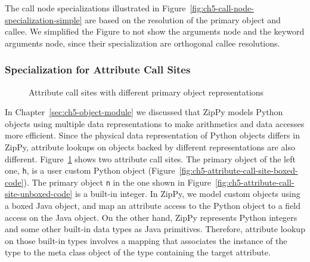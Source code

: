 The call node specializations illustrated in Figure~\ref{fig:ch5-call-node-specialization-simple} are based on the resolution of the primary object and callee.
We simplified the Figure to not show the arguments node and the keyword arguments node, since their specialization are orthogonal callee resolutions.

\subsubsection{Specialization for Attribute Call Sites}

\begin{figure}
\centering
{}
\caption{Attribute call sites with different primary object representations}
\label{fig:ch5-attribute-call-site-boxed-unboxed-code}
\end{figure}

In Chapter~\ref{sec:ch5-object-module} we discussed that ZipPy models Python objects using multiple data representations to make arithmetics and data accesses more efficient.
Since the physical data representation of Python objects differs in ZipPy, attribute lookups on objects backed by different representations are also different.
Figure~\ref{fig:ch5-attribute-call-site-boxed-unboxed-code} shows two attribute call sites.
The primary object of the left one, \texttt{h}, is a user custom Python object (Figure~\ref{fig:ch5-attribute-call-site-boxed-code}).
The primary object \texttt{n} in the one shown in Figure~\ref{fig:ch5-attribute-call-site-unboxed-code} is a built-in integer.
In ZipPy, we model custom objects using a boxed Java object, and map an attribute access to the Python object to a field access on the Java object.
On the other hand, ZipPy represents Python integers and some other built-in data types as Java primitives.
Therefore, attribute lookup on those built-in types involves a mapping that associates the instance of the type to the meta class object of the type containing the target attribute.

